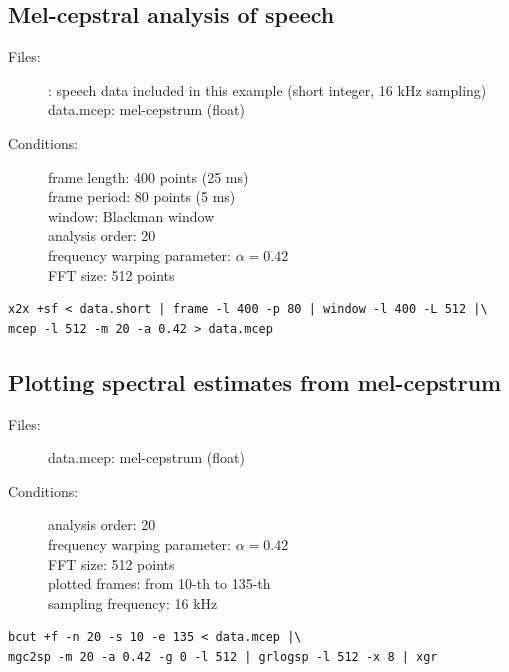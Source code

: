 \documentclass[a4paper,10pt]{article}
\begin{document}
\subsection{Mel-cepstral analysis of speech}

\begin{description}
\item[Files:]
  : speech data included in this example (short integer, 16 kHz sampling)\\
  data.mcep: mel-cepstrum (float)
\item[Conditions:]
  frame length: 400 points (25 ms)\\
  frame period: 80 points (5 ms)\\
  window: Blackman window\\
  analysis order: 20\\
  frequency warping parameter: $\alpha = 0.42$\\
  FFT size: 512 points
\end{description}

\begin{verbatim}
x2x +sf < data.short | frame -l 400 -p 80 | window -l 400 -L 512 |\
mcep -l 512 -m 20 -a 0.42 > data.mcep
\end{verbatim}

\subsection{Plotting spectral estimates from mel-cepstrum}

\begin{description}
\item[Files:]
  data.mcep: mel-cepstrum (float)
\item[Conditions:]
  analysis order: 20\\
  frequency warping parameter: $\alpha = 0.42$\\
  FFT size: 512 points\\
  plotted frames: from 10-th to 135-th\\
  sampling frequency: 16 kHz
\end{description}

\begin{verbatim}
bcut +f -n 20 -s 10 -e 135 < data.mcep |\
mgc2sp -m 20 -a 0.42 -g 0 -l 512 | grlogsp -l 512 -x 8 | xgr
\end{verbatim}
\end{document}
